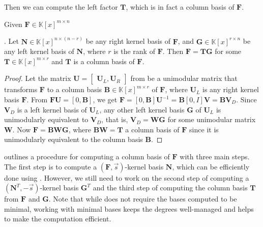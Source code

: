 Then we can compute the left factor $\mathbf{T}$, which is in fact
a column basis of $\mathbf{F}$.
\begin{lem}
\label{lem:matrixGCD}Given $\mathbf{F}\in\mathbb{K}\left[x\right]^{m\times n}$%
\begin{comment}
 and has full row rank
\end{comment}
. Let $\mathbf{N}\in\mathbb{K}\left[x\right]^{n\times(n-r)}$ be any
right kernel basis of $\mathbf{F}$, and $\mathbf{G}\in\mathbb{K}\left[x\right]^{r\times n}$
be any left kernel basis of $\mathbf{N}$, where $r$ is the rank
of $\mathbf{F}$. Then $\mathbf{F}=\mathbf{T}\mathbf{G}$ for some
$\mathbf{T}\in\mathbb{K}\left[x\right]^{m\times r}$ and $\mathbf{T}$
is a column basis of $\mathbf{F}$.\end{lem}
\begin{proof}
Let the matrix $\mathbf{U}=\begin{bmatrix}\mathbf{U}_{L},\mathbf{U}_{R}\end{bmatrix}$
from  be a unimodular
matrix that transforms $\mathbf{F}$ to a column basis $\mathbf{B}\in\mathbb{K}\left[x\right]^{m\times r}$
of $\mathbf{F}$, where $\mathbf{U}_{L}$ is any right kernel basis
$\mathbf{F}$. From $\mathbf{F}\mathbf{U}=\left[0,\mathbf{B}\right]$,
we get\textbf{ $\mathbf{F}=\left[0,\mathbf{B}\right]\mathbf{U}^{-1}=\mathbf{B}\left[0,I\right]\mathbf{V}=\mathbf{B}\mathbf{V}_{D}$}.
Since $\mathbf{V}_{D}$ is a left kernel basis of\textbf{ $\mathbf{U}_{L}$},
any other left kernel basis $\mathbf{G}$ of $\mathbf{U}_{L}$ is
unimodularly equivalent to $\mathbf{V}_{D}$, that is, $\mathbf{V}_{D}=\mathbf{W}\mathbf{G}$
for some unimodular matrix $\mathbf{W}$. Now $\mathbf{F}=\mathbf{B}\mathbf{W}\mathbf{G}$,
where $\mathbf{BW}=\mathbf{T}$ a column basis of $\mathbf{F}$ since
it is unimodularly equivalent to the column basis $\mathbf{B}$.
\end{proof}


 outlines a procedure for computing a column
basis of $\mathbf{F}$ with three main steps. The first step is to
compute a $\left(\mathbf{F},\vec{s}\right)$-kernel basis $\mathbf{N}$,
which can be efficiently done using .
However, we still need to work on the second step of computing a $\left(\mathbf{N}^{T},-\vec{s}\right)$-kernel
basis $\mathbf{G}^{T}$ and the third step of computing the column
basis $\mathbf{T}$ from $\mathbf{F}$ and $\mathbf{G}$. Note that
while  does not require the bases computed
to be minimal, working with minimal bases keeps the degrees well-managed
and helps to make the computation efficient.


